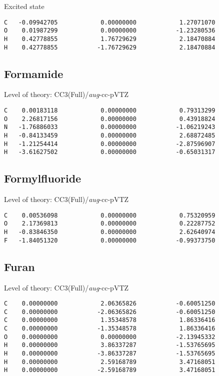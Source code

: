 \documentclass[journal=jctcce,manuscript=article,layout=traditional]{achemso}
\newcommand{\AVTZ}{\emph{aug}-cc-pVTZ}
\begin{document}
\begin{singlespace}
\noindent Excited state
\begin{verbatim}
C   -0.09942705            0.00000000            1.27071070
O    0.01987299            0.00000000           -1.23280536
H    0.42778855            1.76729629            2.18470884
H    0.42778855           -1.76729629            2.18470884
\end{verbatim}
\end{singlespace}

\subsection*{Formamide}

\begin{singlespace}
Level of theory: CC3(Full)/{\AVTZ}
\begin{verbatim}
C    0.00183118            0.00000000            0.79313299
O    2.26817156            0.00000000            0.43918824
N   -1.76886033            0.00000000           -1.06219243
H   -0.84133459            0.00000000            2.68872485
H   -1.21254414            0.00000000           -2.87596907
H   -3.61627502            0.00000000           -0.65031317
\end{verbatim}
\end{singlespace}


\subsection*{Formylfluoride}

\begin{singlespace}
Level of theory: CC3(Full)/{\AVTZ}
\begin{verbatim}
C    0.00536098            0.00000000            0.75320959
O    2.17369813            0.00000000            0.22287752
H   -0.83846350            0.00000000            2.62640974
F   -1.84051320            0.00000000           -0.99373750
\end{verbatim}
\end{singlespace}

\subsection*{Furan}

\begin{singlespace}
Level of theory: CC3(Full)/{\AVTZ}
\begin{verbatim}
C    0.00000000            2.06365826           -0.60051250
C    0.00000000           -2.06365826           -0.60051250
C    0.00000000            1.35348578            1.86336416
C    0.00000000           -1.35348578            1.86336416
O    0.00000000            0.00000000           -2.13945332
H    0.00000000            3.86337287           -1.53765695
H    0.00000000           -3.86337287           -1.53765695
H    0.00000000            2.59168789            3.47168051
H    0.00000000           -2.59168789            3.47168051
\end{verbatim}
\end{singlespace}
\end{document}
